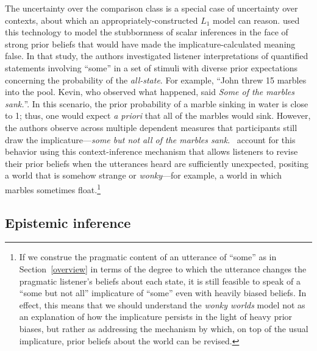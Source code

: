 \documentclass{sp}
\begin{document}
The uncertainty over the comparison class is a special case of uncertainty over contexts, about which an appropriately-constructed $L_1$ model can reason. \cite{degen2015wonky} used this technology to model the stubbornness of scalar inferences in the face of strong prior beliefs that would have made the implicature-calculated meaning false. In that study, the authors investigated listener interpretations of quantified statements involving ``some'' in a set of stimuli with diverse prior expectations concerning the probability of the \emph{all-state}. For example, ``John threw 15 marbles into the pool. Kevin, who observed what happened, said \emph{Some of the marbles sank.}''. In this scenario, the prior probability of a marble sinking in water is close to 1; thus, one would expect \emph{a priori} that all of the marbles would sink. However, the authors observe across multiple dependent measures that participants still draw the implicature---\emph{some but not all of the marbles sank}. \citeauthor{degen2015wonky}~account for this behavior using this context-inference mechanism that allows listeners to revise their prior beliefs when the utterances heard are sufficiently unexpected, positing a world that is somehow strange or \emph{wonky}---for example, a world in which marbles sometimes float.\footnote{
 If we construe the pragmatic content of an utterance of ``some'' as in Section~\ref{overview} in terms of the degree to which the utterance changes the pragmatic listener's beliefs about each state, it is still feasible to speak of a ``some but not all'' implicature of ``some'' even with heavily biased beliefs. In effect, this means that we should understand the \emph{wonky worlds} model not as an explanation of how the implicature persists in the light of heavy prior biases, but rather as addressing the mechanism by which, on top of the usual implicature, prior beliefs about the world can be revised.
}


\subsection{Epistemic inference}
\label{sec:epistemic-inference}
\end{document}
